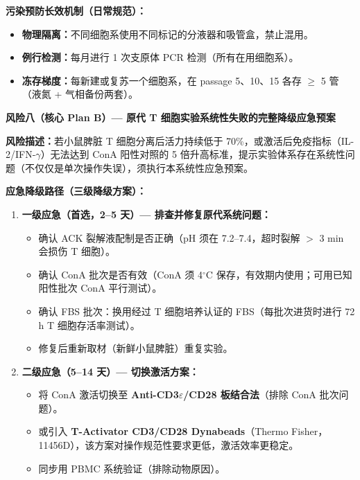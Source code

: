\documentclass[12pt,a4paper,twoside]{article}
\begin{document}
\begin{warningbox}
\textbf{污染预防长效机制（日常规范）：}
\begin{itemize}
  \item \textbf{物理隔离：}不同细胞系使用不同标记的分液器和吸管盒，禁止混用。
  \item \textbf{例行检测：}每月进行 1 次支原体 PCR 检测（所有在用细胞系）。
  \item \textbf{冻存梯度：}每新建或复苏一个细胞系，在 passage 5、10、15 各存 $\geq$ 5 管（液氮 + 气相备份两套）。
\end{itemize}
\end{warningbox}

\begin{warningbox}
\textbf{风险八（核心 Plan B）--- 原代 T 细胞实验系统性失败的完整降级应急预案}

\textbf{风险描述：}若小鼠脾脏 T 细胞分离后活力持续低于 70\%，或激活后免疫指标（IL-2/IFN-$\gamma$）无法达到 ConA 阳性对照的 5 倍升高标准，提示实验体系存在系统性问题（不仅仅是单次操作失误），须执行本系统性应急预案。

\textbf{应急降级路径（三级降级方案）：}

\begin{enumerate}
  \item \textbf{一级应急（首选，2--5 天）--- 排查并修复原代系统问题：}
  \begin{itemize}
    \item 确认 ACK 裂解液配制是否正确（pH 须在 7.2--7.4，超时裂解 $>$ 3 min 会损伤 T 细胞）。
    \item 确认 ConA 批次是否有效（ConA 须 4$^{\circ}$C 保存，有效期内使用；可用已知阳性批次 ConA 平行测试）。
    \item 确认 FBS 批次：换用经过 T 细胞培养认证的 FBS（每批次进货时进行 72 h T 细胞存活率测试）。
    \item 修复后重新取材（新鲜小鼠脾脏）重复实验。
  \end{itemize}

  \item \textbf{二级应急（5--14 天）--- 切换激活方案：}
  \begin{itemize}
    \item 将 ConA 激活切换至 \textbf{Anti-CD3$\varepsilon$/CD28 板结合法}（排除 ConA 批次问题）。
    \item 或引入 \textbf{T-Activator CD3/CD28 Dynabeads}（Thermo Fisher，11456D），该方案对操作规范性要求更低，激活效率更稳定。
    \item 同步用 PBMC 系统验证（排除动物原因）。
  \end{itemize}


\end{enumerate}
\end{warningbox}
\end{document}
